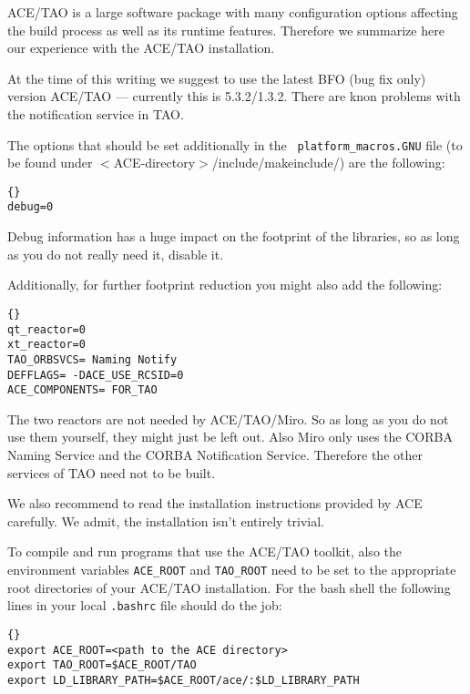 ACE/TAO is a large software package with many configuration
options affecting the build process as well as its runtime
features. Therefore we summarize here our experience with the
ACE/TAO installation.

At the time of this writing we suggest to use the latest BFO (bug fix
only) version ACE/TAO --- currently this is 5.3.2/1.3.2. There are
knon problems with the notification service in TAO.

The options that should be set additionally in the {\tt
  platform\_macros.GNU} file (to be found under
$<$ACE-directory$>$/include/makeinclude/) are the following:

\begin{lstlisting}[frame=tb]{}
debug=0
\end{lstlisting}

Debug information has a huge impact on the footprint of the libraries,
so as long as you do not really need it, disable it.

Additionally, for further footprint reduction you
might also add the following:

\begin{lstlisting}[frame=tb]{}
qt_reactor=0
xt_reactor=0
TAO_ORBSVCS= Naming Notify
DEFFLAGS= -DACE_USE_RCSID=0
ACE_COMPONENTS= FOR_TAO
\end{lstlisting}

The two reactors are not needed by ACE/TAO/Miro. So as long as you do
not use them yourself, they might just be left out. Also Miro only
uses the CORBA Naming Service and the CORBA Notification Service.
Therefore the other services of TAO need not to be built.

We also recommend to read the installation instructions provided
by ACE carefully. We admit, the installation isn't entirely trivial.

To compile and run programs that use the ACE/TAO toolkit, also the
environment variables {\tt ACE\_ROOT} and {\tt TAO\_ROOT} need
to be set to the appropriate root directories of your ACE/TAO
installation. For the bash shell the following lines in your local
{\tt .bashrc} file should do the job:

\begin{lstlisting}[frame=tb]{}
export ACE_ROOT=<path to the ACE directory>
export TAO_ROOT=$ACE_ROOT/TAO
export LD_LIBRARY_PATH=$ACE_ROOT/ace/:$LD_LIBRARY_PATH
\end{lstlisting}

